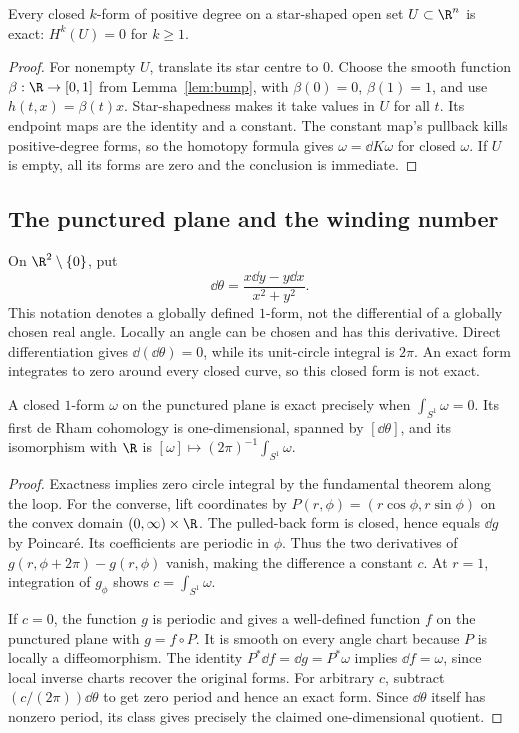 \begin{corollary}\label{cor:poincare}
Every closed $k$-form of positive degree on a star-shaped open set $U\subset\R^n$ is exact: $H^k(U)=0$ for $k\ge1$.
\end{corollary}

\begin{proof}
For nonempty $U$, translate its star centre to $0$. Choose the smooth function $\beta:\R\to[0,1]$ from Lemma~\ref{lem:bump}, with $\beta(0)=0$, $\beta(1)=1$, and use $h(t,x)=\beta(t)x$. Star-shapedness makes it take values in $U$ for all $t$. Its endpoint maps are the identity and a constant. The constant map's pullback kills positive-degree forms, so the homotopy formula gives $\omega=\dd K\omega$ for closed $\omega$. If $U$ is empty, all its forms are zero and the conclusion is immediate.
\end{proof}

\subsection*{The punctured plane and the winding number}

On $\R^2\setminus\{0\}$, put
\[
\dd\theta=\frac{x\dd y-y\dd x}{x^2+y^2}.
\]
This notation denotes a globally defined $1$-form, not the differential of a globally chosen real angle. Locally an angle can be chosen and has this derivative. Direct differentiation gives $\dd(\dd\theta)=0$, while its unit-circle integral is $2\pi$. An exact form integrates to zero around every closed curve, so this closed form is not exact.

\begin{theorem}\label{thm:h1punctured}
A closed $1$-form $\omega$ on the punctured plane is exact precisely when $\int_{S^1}\omega=0$. Its first de Rham cohomology is one-dimensional, spanned by $[\dd\theta]$, and its isomorphism with $\R$ is
$[\omega]\mapsto(2\pi)^{-1}\int_{S^1}\omega$.
\end{theorem}

\begin{proof}
Exactness implies zero circle integral by the fundamental theorem along the loop. For the converse, lift coordinates by $P(r,\phi)=(r\cos\phi,r\sin\phi)$ on the convex domain $(0,\infty)\times\R$. The pulled-back form is closed, hence equals $\dd g$ by Poincar\'e. Its coefficients are periodic in $\phi$. Thus the two derivatives of $g(r,\phi+2\pi)-g(r,\phi)$ vanish, making the difference a constant $c$. At $r=1$, integration of $g_\phi$ shows $c=\int_{S^1}\omega$.

If $c=0$, the function $g$ is periodic and gives a well-defined function $f$ on the punctured plane with $g=f\circ P$. It is smooth on every angle chart because $P$ is locally a diffeomorphism. The identity $P^*\dd f=\dd g=P^*\omega$ implies $\dd f=\omega$, since local inverse charts recover the original forms. For arbitrary $c$, subtract $(c/(2\pi))\dd\theta$ to get zero period and hence an exact form. Since $\dd\theta$ itself has nonzero period, its class gives precisely the claimed one-dimensional quotient.
\end{proof}

